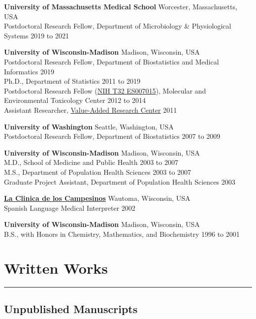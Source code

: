 \documentclass[
  10pt,
]
{article}
\begin{document}
\textbf{University of Massachusetts Medical School} \hfill Worcester,
Massachusetts, USA\\
Postdoctoral Research Fellow, Department of Microbiology \&
Physiological Systems \hfill 2019 to 2021

\textbf{University of Wisconsin-Madison} \hfill Madison, Wisconsin,
USA\\
Postdoctoral Research Fellow, Department of Biostatistics and Medical
Informatics \hfill 2019\\
Ph.D., Department of Statistics \hfill 2011 to 2019\\
Postdoctoral Research Fellow
(\href{https://reporter.nih.gov/search/QFqt1UAzrUORCW6sbBz0qw/project-details/8296307}{NIH
T32 ES007015}), Molecular and Environmental Toxicology Center
\hfill 2012 to 2014\\
Assistant Researcher, \href{https://varc.wceruw.org/}{Value-Added
Research Center} \hfill 2011

\textbf{University of Washington} \hfill Seattle, Washington, USA\\
Postdoctoral Research Fellow, Department of Biostatistics \hfill 2007 to
2009

\textbf{University of Wisconsin-Madison} \hfill Madison, Wisconsin,
USA\\
M.D., School of Medicine and Public Health \hfill 2003 to 2007\\
M.S., Department of Population Health Sciences \hfill 2003 to 2007\\
Graduate Project Assistant, Department of Population Health Sciences
\hfill 2003

\href{https://famhealth.org/}{\textbf{La Clinica de los Campesinos}}
\hfill Wautoma, Wisconsin, USA\\
Spanish Language Medical Interpreter \hfill 2002

\textbf{University of Wisconsin-Madison} \hfill Madison, Wisconsin,
USA\\
B.S., with Honors in Chemistry, Mathematics, and Biochemistry
\hfill 1996 to 2001

\section{Written Works}\label{written-works}

\hrule

\subsection{Unpublished Manuscripts}\label{unpublished-manuscripts}
\end{document}
